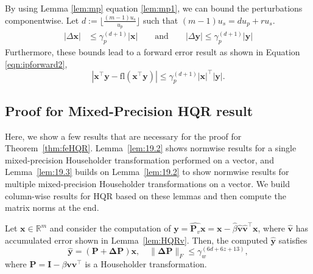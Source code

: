 \documentclass[review,onefignum,onetabnum]{siamart190516}
\newcommand{\R}{\mathbb{R}}
\newcommand{\bb}[1]{\mathbf{#1}}
\newcommand{\fl}{\mathrm{fl}}
\begin{document}
By using Lemma \ref{lem:mp} equation \ref{lem:mp1}, we can bound the perturbations componentwise.
Let $d:=\lfloor\frac{(m-1)u_s}{u_p}\rfloor$ such that $(m-1)u_s = d u_p + r u_s$. 
\begin{align*}
|\Delta \bb{x}| &\leq \gamma_p^{(d+1)}|\bb{x}| %
\qquad \mbox{and} \qquad
|\Delta \bb{y}| %
\leq \gamma_p^{(d+1)}|\bb{y}| 
\end{align*}
Furthermore, these bounds lead to a forward error result as shown in Equation \ref{eqn:ipforward2},
\begin{equation}
\label{eqn:ipforward2}
|\bb{x}^{\top}\bb{y}-\fl(\bb{x}^{\top}\bb{y})| \leq \gamma_p^{(d+1)}|\bb{x}|^{\top}|\bb{y}|.
\end{equation}

\subsection{Proof for Mixed-Precision HQR result}
\label{Appendix:HQR}
Here, we show a few results that are necessary for the proof for Theorem~\ref{thm:feHQR}.
Lemma~\ref{lem:19.2} shows normwise results for a single mixed-precision Householder transformation performed on a vector, and Lemma~\ref{lem:19.3} builds on Lemma~\ref{lem:19.2} to show normwise results for multiple mixed-precision Householder transformations on a vector. 
We build column-wise results for HQR based on these lemmas and then compute the matrix norms at the end.
\begin{lemma}
	\label{lem:19.2}
	Let $\bb{x}\in\R^m$ and consider the computation of $\bb{y}=\hat{\bb P_v}\bb{x} = \bb{x}-\hat{\beta}\hat{\bb{v}}\hat{\bb{v}}^{\top}\bb{x}$, where $\hat{\bb{v}}$ has accumulated error shown in Lemma~\ref{lem:HQRv}.
	Then, the computed $\hat{\bb{y}}$ satisfies 
	\begin{equation}
	\hat{\bb y} = (\bb{P}+\bb{\Delta P}) \bb{x},\quad \|\bb{\Delta P}\|_F\leq\gamma_w^{(6d+6z+13)},
	\end{equation}
	where $\bb{P} = \bb{I}-\beta\bb{v}\bb{v}^{\top}$ is a Householder transformation.
\end{lemma}
\end{document}
